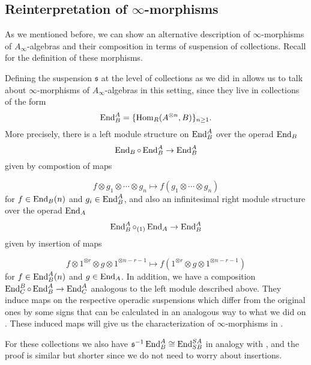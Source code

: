 \documentclass[Thesis.tex]{subfiles}
\begin{document}
\subsection{Reinterpretation of $\infty$-morphisms}\label{reinterpretation}
As we mentioned before, we can show an alternative description of $\infty$-morphisms of $A_\infty$-algebras and their composition in terms of suspension of collections. Recall  for the definition of these morphisms.

Defining the suspension $\mathfrak{s}$ at the level of collections as we did in  allows us to talk about $\infty$-morphisms of $A_\infty$-algebras in this setting, since they live in collections of the form\[\operatorname{End}^A_B=\{\operatorname{Hom}_R(A^{\otimes n},B)\}_{n\geq 1}.\] More precisely, there is a left module structure on $\operatorname{End}^A_B$ over the operad $\operatorname{End}_B$
\[\operatorname{End}_B\circ \operatorname{End}^A_B\to \operatorname{End}^A_B\] given by compostion of maps 

\[f\otimes g_1\otimes\cdots\otimes g_n\mapsto f(g_1\otimes\cdots\otimes g_n)\]
for $f\in\operatorname{End}_B(n)$ and $g_i\in \operatorname{End}^A_B$, and also an infinitesimal right module structure over the operad $\operatorname{End}_A$ 
\[\operatorname{End}^A_B \circ_{(1)} \operatorname{End}_A\to \operatorname{End}^A_B\]
given by insertion of maps

\[f\otimes 1^{\otimes r}\otimes g\otimes 1^{\otimes n-r-1}\mapsto f(1^{\otimes r}\otimes g\otimes 1^{\otimes n-r-1})\] for $f\in \operatorname{End}^A_B(n)$ and $g\in \operatorname{End}_A$. In addition, we have a composition $\operatorname{End}^B_C\circ \operatorname{End}^A_B\to\operatorname{End}^A_C$ analogous to the left module described above. They induce maps on the respective operadic suspensions which differ from the original ones by some signs that can be calculated in an analogous way to what we did on . These induced maps will give us the characterization of $\infty$-morphisms in .

For these collections we also have $\mathfrak{s}^{-1}\operatorname{End}^A_B\cong \operatorname{End}^{SA}_{SB}$ in analogy with , and the proof is similar but shorter since we do not need to worry about insertions. 
\end{document}
